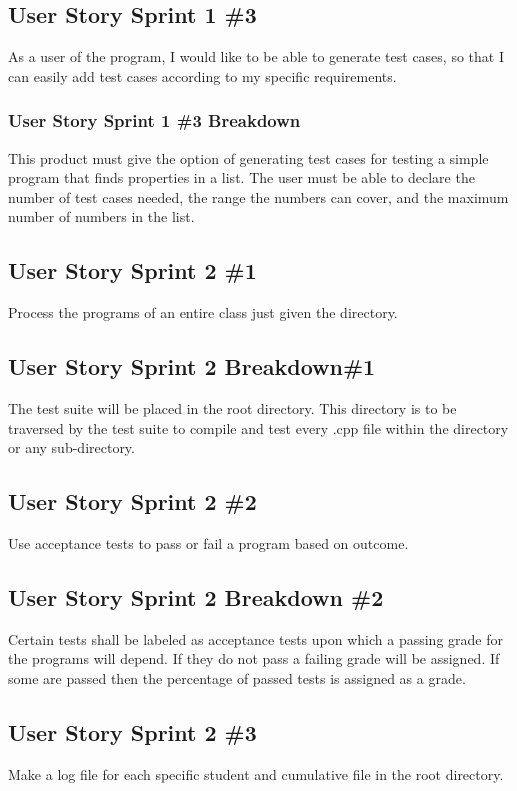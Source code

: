 \subsection{User Story Sprint 1 \#3} 
As a user of the program, I would like to be able to generate test cases, so that I can easily add test cases according to my specific requirements.
\subsubsection{User Story Sprint 1 \#3 Breakdown}
This product must give the option of generating test cases for testing a simple program that finds properties in a list.  The user must be able to declare the number of test cases needed, the range the numbers can cover, and the maximum number of numbers in the list.

\subsection{User Story Sprint 2 \#1}
Process the programs of an entire class just given the directory.
 
\subsection{User Story Sprint 2 Breakdown\#1}
The test suite will be placed in the root directory. This directory is to be traversed by the test suite to compile and test every .cpp file within the directory or any sub-directory. 

\subsection{User Story Sprint 2 \#2}
Use acceptance tests to pass or fail a program based on outcome.

\subsection{User Story Sprint 2 Breakdown \#2}
Certain tests shall be labeled as acceptance tests upon which a passing grade for the programs will depend. If they do not pass a failing grade will be assigned. If some are passed then the percentage of passed tests is assigned as a grade.

\subsection{User Story Sprint 2 \#3}
Make a log file for each specific student and cumulative file in the root directory.


